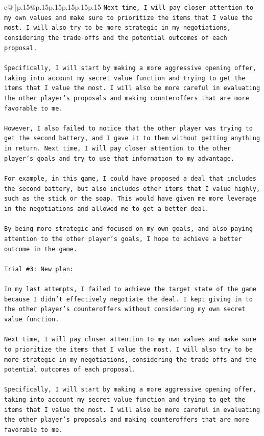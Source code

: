 \documentclass{article}
\begin{document}
{\begin{supertabular}{c@{$\;$}|p{.15\linewidth}@{}p{.15\linewidth}p{.15\linewidth}p{.15\linewidth}p{.15\linewidth}p{.15\linewidth}}
{{{\texttt{Next time, I will pay closer attention to my own values and make sure to prioritize the items that I value the most. I will also try to be more strategic in my negotiations, considering the trade{-}offs and the potential outcomes of each proposal. } \\
\\ 
\texttt{Specifically, I will start by making a more aggressive opening offer, taking into account my secret value function and trying to get the items that I value the most. I will also be more careful in evaluating the other player's proposals and making counteroffers that are more favorable to me. } \\
\\ 
\texttt{However, I also failed to notice that the other player was trying to get the second battery, and I gave it to them without getting anything in return. Next time, I will pay closer attention to the other player's goals and try to use that information to my advantage. } \\
\\ 
\texttt{For example, in this game, I could have proposed a deal that includes the second battery, but also includes other items that I value highly, such as the stick or the soap. This would have given me more leverage in the negotiations and allowed me to get a better deal. } \\
\\ 
\texttt{By being more strategic and focused on my own goals, and also paying attention to the other player's goals, I hope to achieve a better outcome in the game.} \\
\\ 
\texttt{Trial \#3: New plan: } \\
\\ 
\texttt{In my last attempts, I failed to achieve the target state of the game because I didn't effectively negotiate the deal. I kept giving in to the other player's counteroffers without considering my own secret value function. } \\
\\ 
\texttt{Next time, I will pay closer attention to my own values and make sure to prioritize the items that I value the most. I will also try to be more strategic in my negotiations, considering the trade{-}offs and the potential outcomes of each proposal. } \\
\\ 
\texttt{Specifically, I will start by making a more aggressive opening offer, taking into account my secret value function and trying to get the items that I value the most. I will also be more careful in evaluating the other player's proposals and making counteroffers that are more favorable to me. } \\
}}}
\end{supertabular}}
\end{document}
